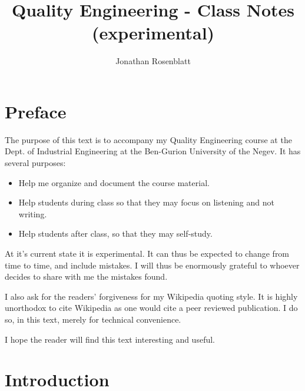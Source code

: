 \documentclass[12pt,a4paper]{report}
\author{Jonathan Rosenblatt}
\title{Quality Engineering - Class Notes (experimental)}
\begin{document}
\maketitle




\chapter*{Preface}
The purpose of this text is to accompany my Quality Engineering course at the Dept. of Industrial Engineering at the Ben-Gurion University of the Negev.
It has several purposes:
\begin{itemize}
\item Help me organize and document the course material.
\item Help students during class so that they may focus on listening and not writing.
\item Help students after class, so that they may self-study.
\end{itemize}

At it's current state it is experimental. It can thus be expected to change from time to time, and include mistakes.
I will thus be enormously grateful to whoever decides to share with me the mistakes found.

I also ask for the readers' forgiveness for my Wikipedia quoting style. 
It is highly unorthodox to cite Wikipedia as one would cite a peer reviewed publication. 
I do so, in this text, merely for technical convenience. 

I hope the reader will find this text interesting and useful. 




\tableofcontents


\listoffigures



\chapter{Introduction}
\end{document}
